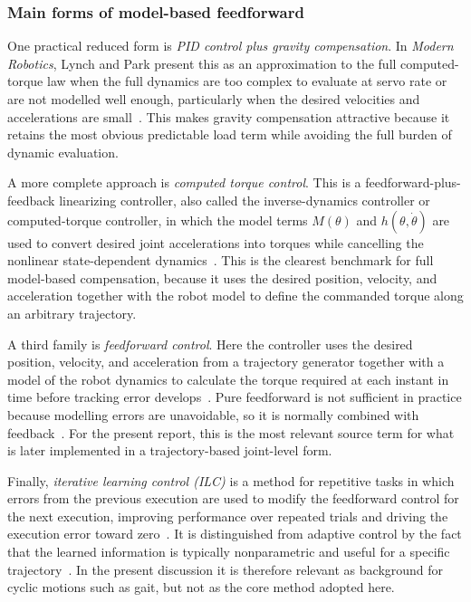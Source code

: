 \subsubsection{Main forms of model-based feedforward}
One practical reduced form is \emph{PID control plus gravity compensation}. In \emph{Modern Robotics}, Lynch and Park present this as an approximation to the full computed-torque law when the full dynamics are too complex to evaluate at servo rate or are not modelled well enough, particularly when the desired velocities and accelerations are small~\cite[pp.~434--435]{lynch2017modernrobotics}. This makes gravity compensation attractive because it retains the most obvious predictable load term while avoiding the full burden of dynamic evaluation.

A more complete approach is \emph{computed torque control}. This is a feedforward-plus-feedback linearizing controller, also called the inverse-dynamics controller or computed-torque controller, in which the model terms \(M(\theta)\) and \(h(\theta,\dot{\theta})\) are used to convert desired joint accelerations into torques while cancelling the nonlinear state-dependent dynamics~\cite[pp.~431--432, 452]{lynch2017modernrobotics}. This is the clearest benchmark for full model-based compensation, because it uses the desired position, velocity, and acceleration together with the robot model to define the commanded torque along an arbitrary trajectory.

A third family is \emph{feedforward control}. Here the controller uses the desired position, velocity, and acceleration from a trajectory generator together with a model of the robot dynamics to calculate the torque required at each instant in time before tracking error develops~\cite[pp.~428--430]{lynch2017modernrobotics}. Pure feedforward is not sufficient in practice because modelling errors are unavoidable, so it is normally combined with feedback~\cite[pp.~429--431]{lynch2017modernrobotics}. For the present report, this is the most relevant source term for what is later implemented in a trajectory-based joint-level form.

Finally, \emph{iterative learning control (ILC)} is a method for repetitive tasks in which errors from the previous execution are used to modify the feedforward control for the next execution, improving performance over repeated trials and driving the execution error toward zero~\cite[p.~450]{lynch2017modernrobotics}. It is distinguished from adaptive control by the fact that the learned information is typically nonparametric and useful for a specific trajectory~\cite[p.~450]{lynch2017modernrobotics}. In the present discussion it is therefore relevant as background for cyclic motions such as gait, but not as the core method adopted here.

